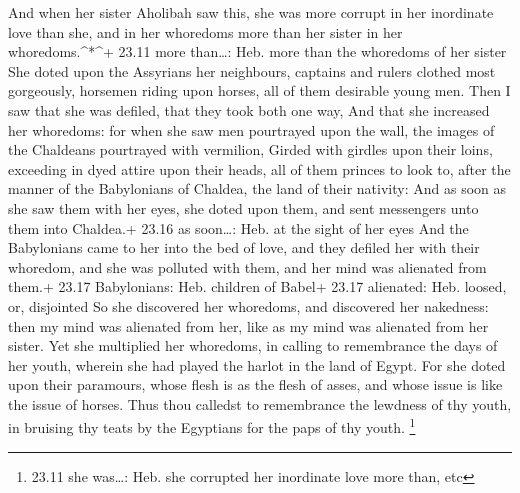 And when her sister Aholibah saw this, she was more
corrupt in her inordinate love than she, and in her whoredoms more than
her sister in her whoredoms.\^{}*\^{}+ 23.11 more than\ldots: Heb. more
than the whoredoms of her sister  She doted upon the
Assyrians her neighbours, captains and rulers clothed most gorgeously,
horsemen riding upon horses, all of them desirable young men.
 Then I saw that she was defiled, that they took both one
way,  And that she increased her whoredoms: for when she
saw men pourtrayed upon the wall, the images of the Chaldeans pourtrayed
with vermilion,  Girded with girdles upon their loins,
exceeding in dyed attire upon their heads, all of them princes to look
to, after the manner of the Babylonians of Chaldea, the land of their
nativity:  And as soon as she saw them with her eyes, she
doted upon them, and sent messengers unto them into Chaldea.+ 23.16 as
soon\ldots: Heb. at the sight of her eyes  And the
Babylonians came to her into the bed of love, and they defiled her with
their whoredom, and she was polluted with them, and her mind was
alienated from them.+ 23.17 Babylonians: Heb. children of Babel+ 23.17
alienated: Heb. loosed, or, disjointed  So she discovered
her whoredoms, and discovered her nakedness: then my mind was alienated
from her, like as my mind was alienated from her sister. 
Yet she multiplied her whoredoms, in calling to remembrance the days of
her youth, wherein she had played the harlot in the land of Egypt.
 For she doted upon their paramours, whose flesh is as the
flesh of asses, and whose issue is like the issue of horses.
 Thus thou calledst to remembrance the lewdness of thy
youth, in bruising thy teats by the Egyptians for the paps of thy youth.
\footnote{23.11 she was\ldots: Heb. she corrupted her inordinate love
  more than, etc}

